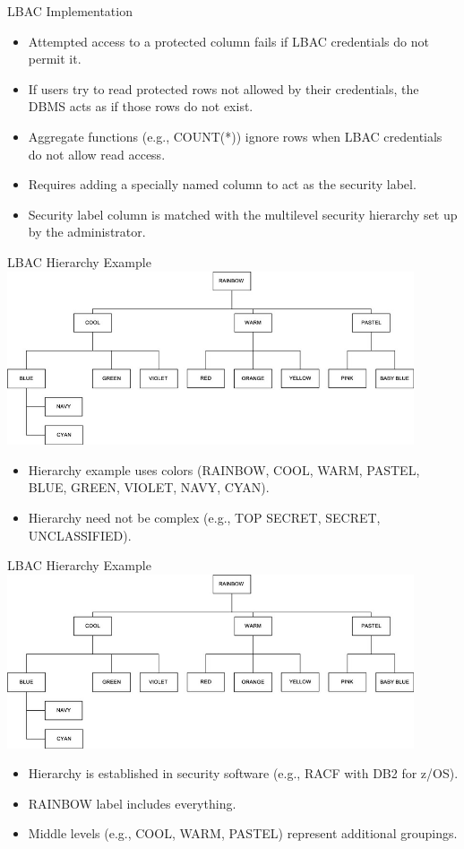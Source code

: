 \documentclass{beamer}
\begin{document}
\begin{frame}{LBAC Implementation}
    \begin{itemize}
        \item Attempted access to a protected column fails if LBAC credentials do not permit it.
        \item If users try to read protected rows not allowed by their credentials, the DBMS acts as if those rows do not exist.
        \item Aggregate functions (e.g., COUNT(*)) ignore rows when LBAC credentials do not allow read access.
        \item Requires adding a specially named column to act as the security label.
        \item Security label column is matched with the multilevel security hierarchy set up by the administrator.
    \end{itemize}
\end{frame}

\begin{frame}{LBAC Hierarchy Example}
    \centering
    \includegraphics[width=0.9\textwidth]{figures/lbac}
    \begin{itemize}
        \item Hierarchy example uses colors (RAINBOW, COOL, WARM, PASTEL, BLUE, GREEN, VIOLET, NAVY, CYAN).
        \item Hierarchy need not be complex (e.g., TOP SECRET, SECRET, UNCLASSIFIED).
    \end{itemize}
\end{frame}
\begin{frame}{LBAC Hierarchy Example}
    \centering
    \includegraphics[width=0.9\textwidth]{figures/lbac}
    \begin{itemize}
        \item Hierarchy is established in security software (e.g., RACF with DB2 for z/OS).
        \item RAINBOW label includes everything.
        \item Middle levels (e.g., COOL, WARM, PASTEL) represent additional groupings.
    \end{itemize}
\end{frame}
\end{document}
